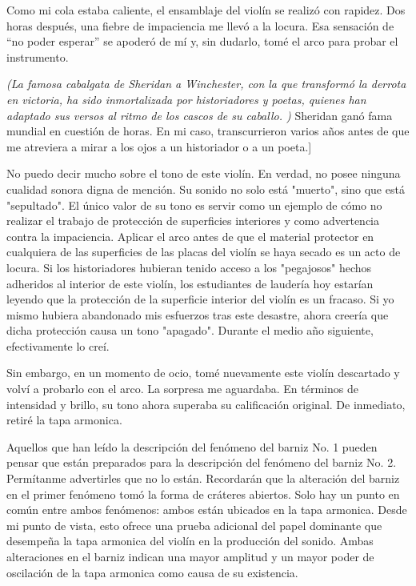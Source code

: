 \documentclass[12pt]{book}
\begin{document}
Como mi cola estaba caliente, el ensamblaje del violín se realizó con rapidez. Dos horas después, una fiebre de impaciencia me llevó a la locura. Esa sensación de ``no poder esperar'' se apoderó de mí y, sin dudarlo, tomé el arco para probar el instrumento.

\textit{(La famosa cabalgata de Sheridan a Winchester, con la que transformó la derrota en victoria, ha sido inmortalizada por historiadores y poetas, quienes han adaptado sus versos al ritmo de los cascos de su caballo. )}  Sheridan ganó fama mundial en cuestión de horas. En mi caso, transcurrieron varios años antes de que me atreviera a mirar a los ojos a un historiador o a un poeta.]

No puedo decir mucho sobre el tono de este violín. En verdad, no posee ninguna cualidad sonora digna de mención. Su sonido no solo está "muerto", sino que está "sepultado". El único valor de su tono es servir como un ejemplo de cómo no realizar el trabajo de protección de superficies interiores y como advertencia contra la impaciencia. Aplicar el arco antes de que el material protector en cualquiera de las superficies de las placas del violín se haya secado es un acto de locura. Si los historiadores hubieran tenido acceso a los "pegajosos" hechos adheridos al interior de este violín, los estudiantes de laudería hoy estarían leyendo que la protección de la superficie interior del violín es un fracaso. Si yo mismo hubiera abandonado mis esfuerzos tras este desastre, ahora creería que dicha protección causa un tono "apagado". Durante el medio año siguiente, efectivamente lo creí.

Sin embargo, en un momento de ocio, tomé nuevamente este violín descartado y volví a probarlo con el arco. La sorpresa me aguardaba. En términos de intensidad y brillo, su tono ahora superaba su calificación original. De inmediato, retiré la tapa armonica.

Aquellos que han leído la descripción del fenómeno del barniz No. 1 pueden pensar que están preparados para la descripción del fenómeno del barniz No. 2. Permítanme advertirles que no lo están. Recordarán que la alteración del barniz en el primer fenómeno tomó la forma de cráteres abiertos. Solo hay un punto en común entre ambos fenómenos: ambos están ubicados en la tapa armonica. Desde mi punto de vista, esto ofrece una prueba adicional del papel dominante que desempeña la tapa armonica del violín en la producción del sonido. Ambas alteraciones en el barniz indican una mayor amplitud y un mayor poder de oscilación de la tapa armonica como causa de su existencia.
\end{document}
